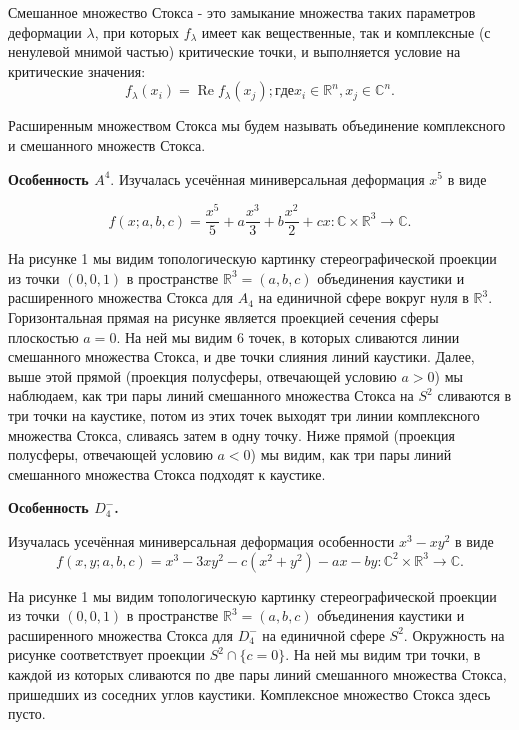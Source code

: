 \begin{definition}
	Смешанное множество Стокса - это замыкание множества таких параметров деформации $\lambda$, при которых $f_\lambda$ имеет как вещественные, так и комплексные (с ненулевой мнимой частью) критические точки, и выполняется условие на критические значения: $$f_\lambda(x_i)=\mathop{\text{Re}}f_\lambda(x_j); где x_i\in\mathbb{R}^n, x_j\in\mathbb{C}^n.$$
\end{definition}

\begin{definition}
	Расширенным множеством Стокса мы будем называть объединение комплексного и смешанного множеств Стокса.
\end{definition}


\textbf{Особенность $A^4.$} Изучалась усечённая миниверсальная деформация $x^5$ в виде

$$
	f(x;a,b,c)=\dfrac{x^5}{5}+a\dfrac{x^3}{3}+b\dfrac{x^2}{2}+cx:\mathbb{C}\times\mathbb{R}^3\rightarrow\mathbb{C}.
$$

На рисунке 1 мы видим топологическую картинку стереографической проекции из точки $(0,0,1)$ в пространстве $\mathbb{R}^3=(a,b,c)$ объединения каустики и расширенного множества Стокса для $A_4$ на единичной сфере вокруг нуля в $\mathbb{R}^3.$ Горизонтальная прямая на рисунке является проекцией сечения сферы плоскостью $a=0.$ На ней мы видим 6 точек, в которых сливаются линии смешанного множества Стокса, и две точки слияния линий каустики. Далее, выше этой прямой (проекция полусферы, отвечающей условию $a>0$) мы наблюдаем, как три пары линий смешанного множества Стокса на $S^2$ сливаются в три точки на каустике, потом из этих точек выходят три линии комплексного множества Стокса, сливаясь затем в одну точку. Ниже прямой (проекция полусферы, отвечающей условию $a<0$) мы видим, как три пары линий смешанного множества Стокса подходят к каустике.

\textbf{Особенность $D_{4}^-$.}

Изучалась усечённая миниверсальная деформация особенности $x^3-xy^2$ в виде $$f(x,y;a,b,c)=x^3-3xy^2-c(x^2+y^2)-ax-by:\mathbb{C}^2\times\mathbb{R}^3\rightarrow\mathbb{C}.$$

 На рисунке 1 мы видим топологическую картинку стереографической проекции из точки $(0,0,1)$ в пространстве $\mathbb{R}^3=(a,b,c)$ объединения каустики и расширенного множества Стокса для $D_4^-$ на единичной сфере $S^2.$ Окружность на рисунке соответствует проекции $S^2\cap\{c=0\}.$ На ней мы видим три точки, в каждой из которых сливаются по две пары линий смешанного множества Стокса, пришедших из соседних углов каустики. Комплексное множество Стокса здесь пусто.

